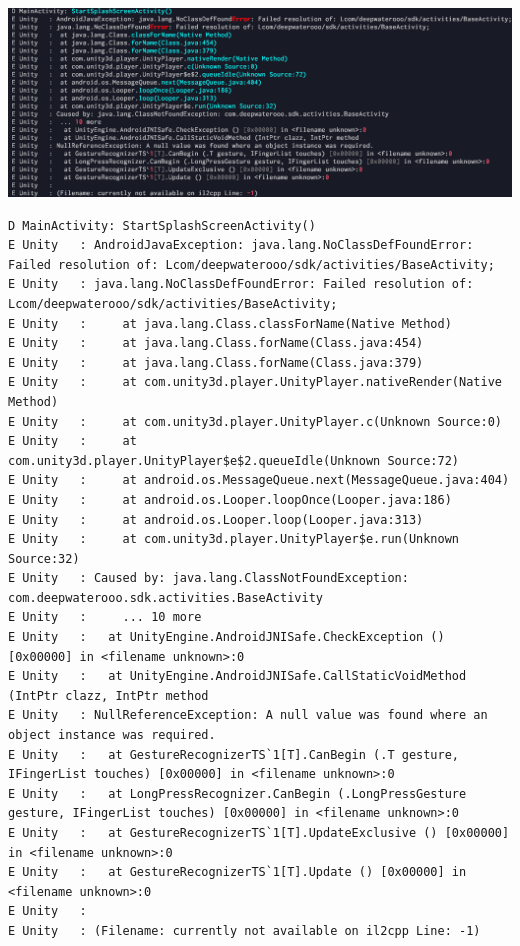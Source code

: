 \documentclass[9pt, b5paper]{article}
\begin{document}
\includegraphics[width=.9\linewidth]{./pic/readme_20221220_151607.png}
\begin{verbatim}
D MainActivity: StartSplashScreenActivity() 
E Unity   : AndroidJavaException: java.lang.NoClassDefFoundError: Failed resolution of: Lcom/deepwaterooo/sdk/activities/BaseActivity;
E Unity   : java.lang.NoClassDefFoundError: Failed resolution of: Lcom/deepwaterooo/sdk/activities/BaseActivity;
E Unity   : 	at java.lang.Class.classForName(Native Method)
E Unity   : 	at java.lang.Class.forName(Class.java:454)
E Unity   : 	at java.lang.Class.forName(Class.java:379)
E Unity   : 	at com.unity3d.player.UnityPlayer.nativeRender(Native Method)
E Unity   : 	at com.unity3d.player.UnityPlayer.c(Unknown Source:0)
E Unity   : 	at com.unity3d.player.UnityPlayer$e$2.queueIdle(Unknown Source:72)
E Unity   : 	at android.os.MessageQueue.next(MessageQueue.java:404)
E Unity   : 	at android.os.Looper.loopOnce(Looper.java:186)
E Unity   : 	at android.os.Looper.loop(Looper.java:313)
E Unity   : 	at com.unity3d.player.UnityPlayer$e.run(Unknown Source:32)
E Unity   : Caused by: java.lang.ClassNotFoundException: com.deepwaterooo.sdk.activities.BaseActivity
E Unity   : 	... 10 more
E Unity   :   at UnityEngine.AndroidJNISafe.CheckException () [0x00000] in <filename unknown>:0 
E Unity   :   at UnityEngine.AndroidJNISafe.CallStaticVoidMethod (IntPtr clazz, IntPtr method
E Unity   : NullReferenceException: A null value was found where an object instance was required.
E Unity   :   at GestureRecognizerTS`1[T].CanBegin (.T gesture, IFingerList touches) [0x00000] in <filename unknown>:0 
E Unity   :   at LongPressRecognizer.CanBegin (.LongPressGesture gesture, IFingerList touches) [0x00000] in <filename unknown>:0 
E Unity   :   at GestureRecognizerTS`1[T].UpdateExclusive () [0x00000] in <filename unknown>:0 
E Unity   :   at GestureRecognizerTS`1[T].Update () [0x00000] in <filename unknown>:0 
E Unity   :  
E Unity   : (Filename: currently not available on il2cpp Line: -1)
\end{verbatim}
\end{document}
